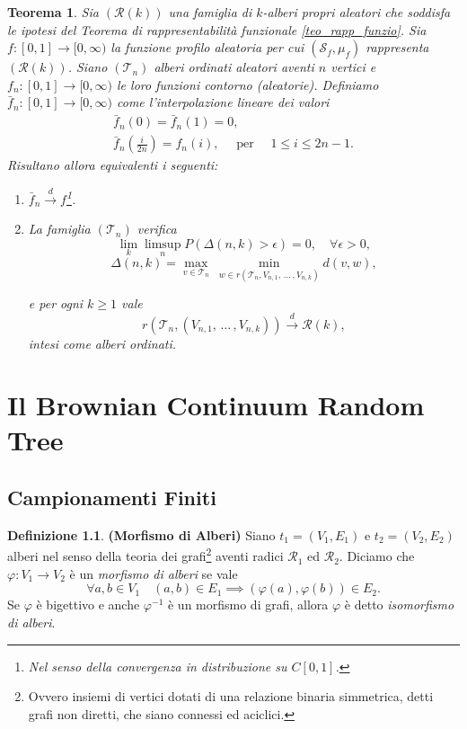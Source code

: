 \documentclass[11pt, twoside]{report}
\renewcommand{\phi}{\varphi}
\newcommand{\Ss}{\mathscr{S}}
\newcommand{\Rr}{\mathscr{R}}
\newcommand{\Tt}{\mathscr{T}}
\theoremstyle{definition}
\newtheorem{definizione}{Definizione}[chapter]
\theoremstyle{plain}
\newtheorem{teo}{Teorema}[chapter]
\theoremstyle{remark}
\numberwithin{equation}{chapter}
\begin{document}
\begin{teo} \label{teo_equiv_contour_finiteSampling}
Sia $(\Rr(k))$ una famiglia di $k$-alberi propri aleatori che soddisfa le ipotesi del Teorema di rappresentabilità funzionale \ref{teo_rapp_funzio}. Sia ${f:[0,1]\longrightarrow [0,\infty)}$ la funzione profilo aleatoria per cui $(\Ss_f, \mu_f)$ rappresenta $\left(\Rr(k)\right)$. Siano $(\Tt_n)$ alberi ordinati aleatori aventi $n$ vertici e ${f_n:[0,1]\longrightarrow [0,\infty)}$ le loro funzioni contorno (aleatorie). Definiamo $\bar{f}_n:[0,1]\longrightarrow[0,\infty)$ come l'interpolazione lineare dei valori
\begin{gather}
\bar{f}_n(0)=\bar{f}_n(1)=0, \nonumber \\
\bar{f}_n\left(\frac{i}{2n}\right)=f_n(i), \quad \text{ per } \quad 1\leq i\leq 2n-1. \nonumber
\end{gather}
Risultano allora equivalenti i seguenti:
\begin{enumerate}
\item $\bar{f}_n\xrightarrow{d}f $\footnote{Nel senso della convergenza in distribuzione su $C[0,1]$.}.

\item La famiglia $\left(\Tt_n\right)$ verifica 
$$\lim\limits_k \limsup_n P(\Delta(n,k)>\epsilon)=0, \quad \forall \epsilon>0,$$
$$\Delta(n,k)=\max\limits_{v\in\Tt_n} \ \min\limits_{w\in r\left(\Tt_n, V_{n,1}, \, \dots \, ,V_{n,k}\right)} d(v,w),$$


e per ogni $k\geq 1 $ vale
$$r\left(\Tt_n, \left(V_{n,1}, \, \dots \, ,V_{n,k}\right)\right)\xrightarrow{d}\Rr(k),$$
intesi come alberi ordinati.
\end{enumerate}
\end{teo}




\chapter{Il Brownian Continuum Random Tree}
\section{Campionamenti Finiti}

\begin{definizione}{\textbf{(Morfismo di Alberi)}}
Siano $t_1=(V_1, E_1)$ e $t_2=(V_2, E_2)$ alberi nel senso della teoria dei grafi\footnote{Ovvero insiemi di vertici dotati di una relazione binaria simmetrica, detti grafi non diretti, che siano connessi ed aciclici.} aventi radici $\mathcal{R}_1$ ed $\mathcal{R}_2$. Diciamo che $\phi: V_1 \longrightarrow V_2$ è un \textit{morfismo di alberi} se vale
$$\forall a,b\in V_1 \quad (a,b)\in E_1 \implies \left(\phi(a),\phi(b)\right)\in E_2.$$
Se $\phi$ è bigettivo e anche $\phi^{-1}$ è un morfismo di grafi, allora $\phi$ è detto \textit{isomorfismo di alberi}.
\end{definizione}
\bigskip
\end{document}
